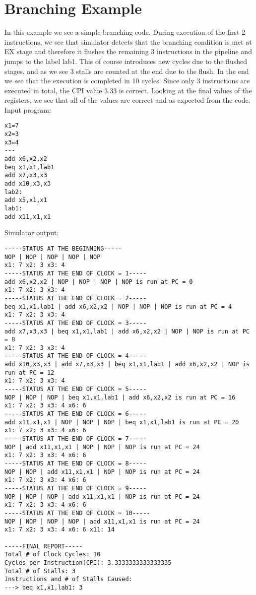 \section{Branching Example}
In this example we see a simple branching code. During execution of the first 2 instructions, we see that simulator detects that the branching condition is met at EX stage and therefore it flushes the remaining 3 instructions in the pipeline and jumps to the label lab1. This of course introduces new cycles due to the flushed stages, and as we see 3 stalls are counted at the end due to the flush. In the end we see that the execution is completed in 10 cycles. Since only 3 instructions are executed in total, the CPI value 3.33 is correct. Looking at the final values of the registers, we see that all of the values are correct and as expected from the code.
\\

\noindent Input program:
\vspace{0.5 cm}
\begin{lstlisting}
x1=7
x2=3
x3=4
---
add x6,x2,x2
beq x1,x1,lab1
add x7,x3,x3
add x10,x3,x3
lab2:
add x5,x1,x1
lab1:
add x11,x1,x1
\end{lstlisting}
\vspace{0.5 cm}
Simulator output:
\vspace{0.5 cm}
\begin{lstlisting}
-----STATUS AT THE BEGINNING-----
NOP | NOP | NOP | NOP | NOP
x1: 7 x2: 3 x3: 4 
-----STATUS AT THE END OF CLOCK = 1-----
add x6,x2,x2 | NOP | NOP | NOP | NOP is run at PC = 0
x1: 7 x2: 3 x3: 4 
-----STATUS AT THE END OF CLOCK = 2-----
beq x1,x1,lab1 | add x6,x2,x2 | NOP | NOP | NOP is run at PC = 4
x1: 7 x2: 3 x3: 4 
-----STATUS AT THE END OF CLOCK = 3-----
add x7,x3,x3 | beq x1,x1,lab1 | add x6,x2,x2 | NOP | NOP is run at PC = 8
x1: 7 x2: 3 x3: 4 
-----STATUS AT THE END OF CLOCK = 4-----
add x10,x3,x3 | add x7,x3,x3 | beq x1,x1,lab1 | add x6,x2,x2 | NOP is run at PC = 12
x1: 7 x2: 3 x3: 4 
-----STATUS AT THE END OF CLOCK = 5-----
NOP | NOP | NOP | beq x1,x1,lab1 | add x6,x2,x2 is run at PC = 16
x1: 7 x2: 3 x3: 4 x6: 6 
-----STATUS AT THE END OF CLOCK = 6-----
add x11,x1,x1 | NOP | NOP | NOP | beq x1,x1,lab1 is run at PC = 20
x1: 7 x2: 3 x3: 4 x6: 6 
-----STATUS AT THE END OF CLOCK = 7-----
NOP | add x11,x1,x1 | NOP | NOP | NOP is run at PC = 24
x1: 7 x2: 3 x3: 4 x6: 6 
-----STATUS AT THE END OF CLOCK = 8-----
NOP | NOP | add x11,x1,x1 | NOP | NOP is run at PC = 24
x1: 7 x2: 3 x3: 4 x6: 6 
-----STATUS AT THE END OF CLOCK = 9-----
NOP | NOP | NOP | add x11,x1,x1 | NOP is run at PC = 24
x1: 7 x2: 3 x3: 4 x6: 6 
-----STATUS AT THE END OF CLOCK = 10-----
NOP | NOP | NOP | NOP | add x11,x1,x1 is run at PC = 24
x1: 7 x2: 3 x3: 4 x6: 6 x11: 14 

-----FINAL REPORT-----
Total # of Clock Cycles: 10
Cycles per Instruction(CPI): 3.3333333333333335
Total # of Stalls: 3
Instructions and # of Stalls Caused: 
---> beq x1,x1,lab1: 3
\end{lstlisting}



